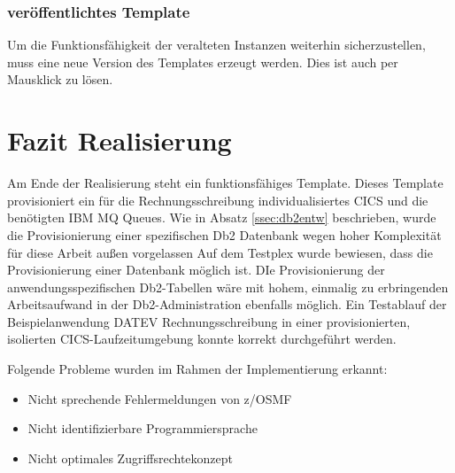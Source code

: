 \subsubsection{veröffentlichtes Template}
Um die Funktionsfähigkeit der veralteten Instanzen weiterhin sicherzustellen, muss eine neue Version des Templates erzeugt werden.
Dies ist auch per Mausklick zu lösen.

\section{Fazit Realisierung}
Am Ende der Realisierung steht ein funktionsfähiges Template.
Dieses Template provisioniert ein für die Rechnungsschreibung individualisiertes CICS und die benötigten IBM MQ Queues. 
Wie in Absatz \ref{ssec:db2entw} beschrieben, wurde die Provisionierung einer spezifischen Db2 Datenbank wegen hoher Komplexität für diese Arbeit außen vorgelassen
Auf dem Testplex wurde bewiesen, dass die Provisionierung einer Datenbank möglich ist.
DIe Provisionierung der anwendungsspezifischen Db2-Tabellen wäre mit hohem, einmalig zu erbringenden Arbeitsaufwand in der Db2-Administration ebenfalls möglich.
Ein Testablauf der Beispielanwendung DATEV Rechnungsschreibung in einer provisionierten, isolierten CICS-Laufzeitumgebung konnte korrekt durchgeführt werden.

Folgende Probleme wurden im Rahmen der Implementierung erkannt:

\begin{samepage}
\begin{itemize}
\item Nicht sprechende Fehlermeldungen von z/OSMF
\item Nicht identifizierbare Programmiersprache
\item Nicht optimales Zugriffsrechtekonzept
\end{itemize}
\end{samepage}

